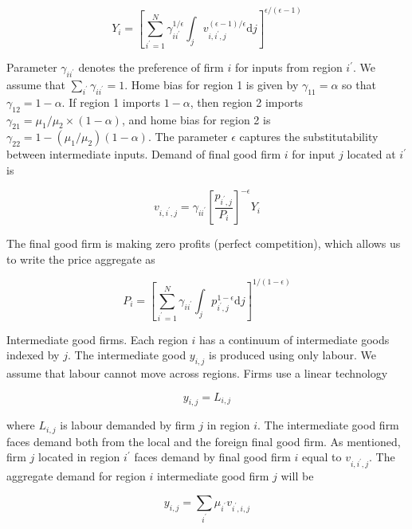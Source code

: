 \documentclass[10pt]{article}
\begin{document}
\begin{equation*}
Y_{i}=\left[\sum_{i^{\prime}=1}^{N} \gamma_{i i^{\prime}}^{1 / \epsilon} \int_{j} v_{i, i^{\prime}, j}^{(\epsilon-1) / \epsilon} \mathrm{d} j\right]^{\epsilon /(\epsilon-1)} \tag{4.11}
\end{equation*}


Parameter $\gamma_{i i^{\prime}}$ denotes the preference of firm $i$ for inputs from region $i^{\prime}$. We assume that $\sum_{i^{\prime}} \gamma_{i i^{\prime}}=1$. Home bias for region 1 is given by $\gamma_{11}=\alpha$ so that $\gamma_{12}=1-\alpha$. If region 1 imports $1-\alpha$, then region 2 imports $\gamma_{21}=\mu_{1} / \mu_{2} \times(1-\alpha)$, and home bias for region 2 is $\gamma_{22}=1-\left(\mu_{1} / \mu_{2}\right)(1-\alpha)$. The parameter $\epsilon$ captures the substitutability between intermediate inputs. Demand of final good firm $i$ for input $j$ located at $i^{\prime}$ is


\begin{equation*}
v_{i, i^{\prime}, j}=\gamma_{i i^{\prime}}\left[\frac{p_{i^{\prime}, j}}{P_{i}}\right]^{-\epsilon} Y_{i} \tag{4.12}
\end{equation*}


The final good firm is making zero profits (perfect competition), which allows us to write the price aggregate as


\begin{equation*}
P_{i}=\left[\sum_{i^{\prime}=1}^{N} \gamma_{i i^{\prime}} \int_{j} p_{i^{\prime}, j}^{1-\epsilon} \mathrm{d} j\right]^{1 /(1-\epsilon)} \tag{4.13}
\end{equation*}


Intermediate good firms. Each region $i$ has a continuum of intermediate goods indexed by $j$. The intermediate good $y_{i, j}$ is produced using only labour. We assume that labour cannot move across regions. Firms use a linear technology


\begin{equation*}
y_{i, j}=L_{i, j} \tag{4.14}
\end{equation*}


where $L_{i, j}$ is labour demanded by firm $j$ in region $i$. The intermediate good firm faces demand both from the local and the foreign final good firm. As mentioned, firm $j$ located in region $i^{\prime}$ faces demand by final good firm $i$ equal to $v_{i, i^{\prime}, j}$. The aggregate demand for region $i$ intermediate good firm $j$ will be


\begin{equation*}
y_{i, j}=\sum_{i^{\prime}} \mu_{i^{\prime}} v_{i^{\prime}, i, j} \tag{4.15}
\end{equation*}
\end{document}
